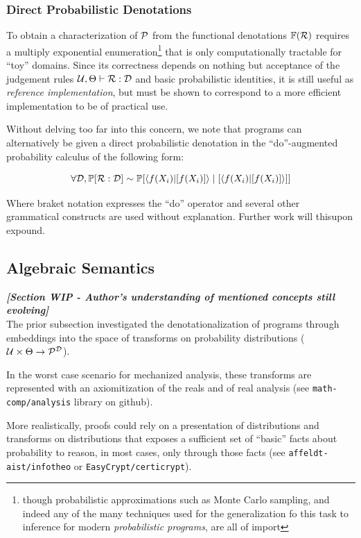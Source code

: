 \documentclass{article}
\begin{document}
\subsubsection{Direct Probabilistic Denotations}

To obtain a characterization of $\P$ from the functional denotations $\F(\R)$ requires a multiply exponential enumeration\footnote{though probabilistic approximations such as Monte Carlo sampling, and indeed any of the many techniques used for the generalization fo this task to inference for modern \textit{probabilistic programs}, are all of import} that is only computationally tractable for ``toy'' domains. Since its correctness depends on nothing but acceptance of the judgement rules $\U, \MU \vdash \R : \D$ and basic probabilistic identities, it is still useful as \textit{reference implementation}, but must be shown to correspond to a more efficient implementation to be of practical use.

Without delving too far into this concern, we note that \AIM programs can alternatively be given a direct probabilistic denotation in the ``do''-augmented probability calculus of the following form:

\begin{equation*}
  \forall \D, \mathbb{P}[\R : \D] \sim \mathbb{P}[\braket{f(X_i)|[f(X_i)]} \mid [\braket{f(X_i)|[f(X_i)]}]]
\end{equation*}

Where braket notation expresses the ``do'' operator and several other grammatical constructs are used without explanation. Further work will thisupon expound.

\subsection{Algebraic Semantics}

\textit{\textbf{[Section WIP - Author's understanding of mentioned concepts still evolving]}}\\

The prior subsection investigated the denotationalization of \AIM programs through embeddings into the space of transforms on probability distributions ($\U \times \MU \to \P^\D$).

In the worst case scenario for mechanized analysis, these transforms are represented with an axiomitization of the reals and of real analysis (see \texttt{math-comp/analysis} library on github).

More realistically, proofs could rely on a presentation of distributions and transforms on distributions that exposes a sufficient set of ``basic'' facts about probability to reason, in most cases, only through those facts (see \texttt{affeldt-aist/infotheo} or \texttt{EasyCrypt/certicrypt}).
\end{document}
